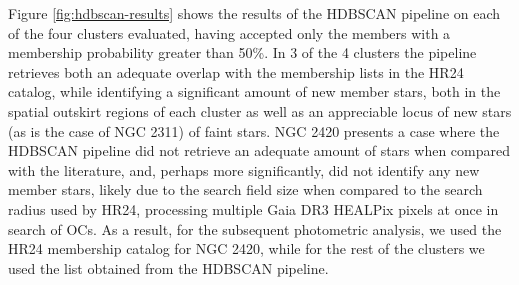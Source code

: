 Figure \ref{fig:hdbscan-results} shows the results of the HDBSCAN pipeline on each of the four clusters evaluated, having accepted only the members with a membership probability greater than 50\%. In 3 of the 4 clusters the pipeline retrieves both an adequate overlap with the membership lists in the HR24 catalog, while identifying a significant amount of new member stars, both in the spatial outskirt regions of each cluster as well as an appreciable locus of new stars (as is the case of NGC 2311) of faint stars. NGC 2420 presents a case where the HDBSCAN pipeline did not retrieve an adequate amount of stars when compared with the literature, and, perhaps more significantly, did not identify any new member stars, likely due to the search field size when compared to the search radius used by HR24, processing multiple Gaia DR3 HEALPix pixels at once in search of OCs. As a result, for the subsequent photometric analysis, we used the HR24 membership catalog for NGC 2420, while for the rest of the clusters we used the list obtained from the HDBSCAN pipeline.